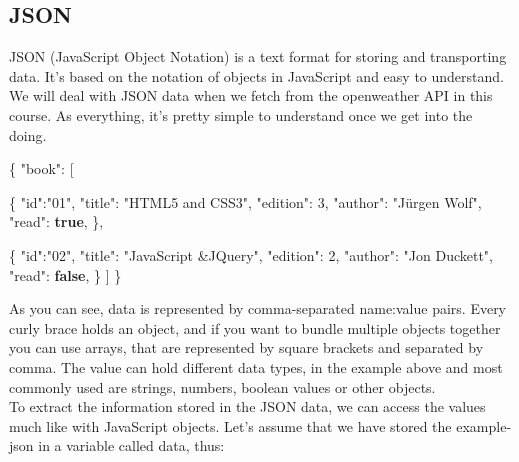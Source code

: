 \documentclass[
]{article}
\newenvironment{Shaded}{\begin{snugshade}}{\end{snugshade}}
\newcommand{\DataTypeTok}[1]{\textcolor[rgb]{0.13,0.29,0.53}{#1}}
\newcommand{\DecValTok}[1]{\textcolor[rgb]{0.00,0.00,0.81}{#1}}
\newcommand{\FunctionTok}[1]{\textcolor[rgb]{0.00,0.00,0.00}{#1}}
\newcommand{\KeywordTok}[1]{\textcolor[rgb]{0.13,0.29,0.53}{\textbf{#1}}}
\newcommand{\OtherTok}[1]{\textcolor[rgb]{0.56,0.35,0.01}{#1}}
\newcommand{\StringTok}[1]{\textcolor[rgb]{0.31,0.60,0.02}{#1}}
\begin{document}
\hypertarget{json}{%
\subsection{JSON}\label{json}}

JSON (JavaScript Object Notation) is a text format for storing and transporting data. It's based on the notation of objects in JavaScript and easy to understand. We will deal with JSON data when we fetch from the openweather API in this course. As everything, it's pretty simple to understand once we get into the doing.

\begin{Shaded}
\begin{Highlighting}[]
\FunctionTok{\{}
   \DataTypeTok{"book"}\FunctionTok{:} \OtherTok{[}
    
      \FunctionTok{\{}
         \DataTypeTok{"id"}\FunctionTok{:}\StringTok{"01"}\FunctionTok{,}
         \DataTypeTok{"title"}\FunctionTok{:} \StringTok{"HTML5 and CSS3"}\FunctionTok{,}
         \DataTypeTok{"edition"}\FunctionTok{:} \DecValTok{3}\FunctionTok{,}
         \DataTypeTok{"author"}\FunctionTok{:} \StringTok{"Jürgen Wolf"}\FunctionTok{,}
         \DataTypeTok{"read"}\FunctionTok{:} \KeywordTok{true}\FunctionTok{,}
      \FunctionTok{\}}\OtherTok{,}
    
      \FunctionTok{\{}
         \DataTypeTok{"id"}\FunctionTok{:}\StringTok{"02"}\FunctionTok{,}
         \DataTypeTok{"title"}\FunctionTok{:} \StringTok{"JavaScript \&JQuery"}\FunctionTok{,}
         \DataTypeTok{"edition"}\FunctionTok{:} \DecValTok{2}\FunctionTok{,}
         \DataTypeTok{"author"}\FunctionTok{:} \StringTok{"Jon Duckett"}\FunctionTok{,}
         \DataTypeTok{"read"}\FunctionTok{:} \KeywordTok{false}\FunctionTok{,}
      \FunctionTok{\}}
   \OtherTok{]}
\FunctionTok{\}}
\end{Highlighting}
\end{Shaded}

As you can see, data is represented by comma-separated name:value pairs. Every curly brace holds an object, and if you want to bundle multiple objects together you can use arrays, that are represented by square brackets and separated by comma. The value can hold different data types, in the example above and most commonly used are strings, numbers, boolean values or other objects.\\
To extract the information stored in the JSON data, we can access the values much like with JavaScript objects. Let's assume that we have stored the example-json in a variable called data, thus:
\end{document}
